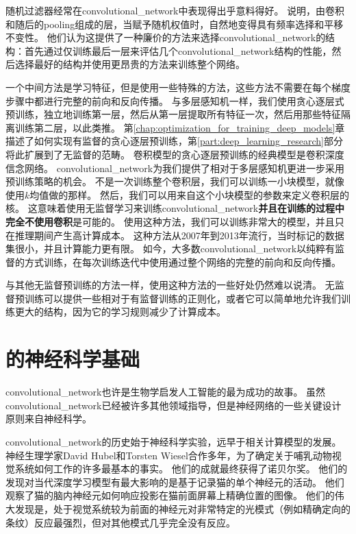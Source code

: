  
随机过滤器经常在\gls{convolutional_network}中表现得出乎意料得好\cite{Jarrett-ICCV2009-small,Saxe-ICML2011,pinto2011scaling,cox2011beyond}。
\cite{Saxe-ICML2011}说明，由卷积和随后的\gls{pooling}组成的层，当赋予随机权值时，自然地变得具有频率选择和平移不变性。
他们认为这提供了一种廉价的方法来选择\gls{convolutional_network}的结构：首先通过仅训练最后一层来评估几个\gls{convolutional_network}结构的性能，然后选择最好的结构并使用更昂贵的方法来训练整个网络。

一个中间方法是学习特征，但是使用一些特殊的方法，这些方法不需要在每个梯度步骤中都进行完整的前向和反向传播。
与多层感知机一样，我们使用贪心逐层式预训练，独立地训练第一层，然后从第一层提取所有特征一次，然后用那些特征隔离训练第二层，以此类推。
第\ref{chap:optimization_for_training_deep_models}章描述了如何实现有监督的贪心逐层预训练，第\ref{part:deep_learning_research}部分将此扩展到了无监督的范畴。
卷积模型的贪心逐层预训练的经典模型是卷积深度信念网络\citep{HonglakL2009}。
\gls{convolutional_network}为我们提供了相对于多层感知机更进一步采用预训练策略的机会。
不是一次训练整个卷积层，我们可以训练一小块模型，就像\cite{Coates2011}使用$k$均值做的那样。
然后，我们可以用来自这个小块模型的参数来定义卷积层的核。
这意味着使用无监督学习来训练\gls{convolutional_network}\textbf{并且在训练的过程中完全不使用卷积}是可能的。
使用这种方法，我们可以训练非常大的模型，并且只在推理期间产生高计算成本\citep{ranzato-cvpr-07-small,Jarrett-ICCV2009-small,koray-nips-10-small,icml2013_coates13}。
这种方法从2007年到2013年流行，当时标记的数据集很小，并且计算能力更有限。
如今，大多数\gls{convolutional_network}以纯粹有监督的方式训练，在每次训练迭代中使用通过整个网络的完整的前向和反向传播。
 
 
与其他无监督预训练的方法一样，使用这种方法的一些好处仍然难以说清。
无监督预训练可以提供一些相对于有监督训练的正则化，或者它可以简单地允许我们训练更大的结构，因为它的学习规则减少了计算成本。

\section{的神经科学基础}
\label{sec:the_neuroscientific_basis_for_convolutional_networks}

\gls{convolutional_network}也许是生物学启发人工智能的最为成功的故事。
虽然\gls{convolutional_network}已经被许多其他领域指导，但是神经网络的一些关键设计原则来自神经科学。

\gls{convolutional_network}的历史始于神经科学实验，远早于相关计算模型的发展。
神经生理学家David Hubel和Torsten Wiesel合作多年，为了确定关于哺乳动物视觉系统如何工作的许多最基本的事实\citep{Hubel+Wiesel-1959,Hubel62,Hubel+Wiesel-1968}。
他们的成就最终获得了诺贝尔奖。
他们的发现对当代深度学习模型有最大影响的是基于记录猫的单个神经元的活动。
他们观察了猫的脑内神经元如何响应投影在猫前面屏幕上精确位置的图像。
他们的伟大发现是，处于视觉系统较为前面的神经元对非常特定的光模式（例如精确定向的条纹）反应最强烈，但对其他模式几乎完全没有反应。

